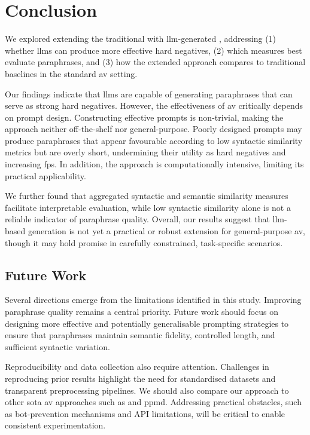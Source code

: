 \chapter{Conclusion}
\label{chap:conclusion}

We explored extending the traditional \impAppr{} with \ac{llm}-generated \imps{}, addressing (1) whether \acp{llm} can produce more effective hard negatives, (2) which measures best evaluate paraphrases, and (3) how the extended approach compares to traditional baselines in the standard \ac{av} setting.

Our findings indicate that \acp{llm} are capable of generating paraphrases that can serve as strong hard negatives. 
However, the effectiveness of \ac{av} critically depends on prompt design. 
Constructing effective prompts is non-trivial, making the approach neither off-the-shelf nor general-purpose. 
Poorly designed prompts may produce paraphrases that appear favourable according to low syntactic similarity metrics but are overly short, undermining their utility as hard negatives and increasing \acp{fp}. 
In addition, the approach is computationally intensive, limiting its practical applicability.  

We further found that aggregated syntactic and semantic similarity measures facilitate interpretable evaluation, while low syntactic similarity alone is not a reliable indicator of paraphrase quality. 
Overall, our results suggest that \ac{llm}-based \imp{} generation is not yet a practical or robust extension for general-purpose \ac{av}, though it may hold promise in carefully constrained, task-specific scenarios.  



\section{Future Work}

Several directions emerge from the limitations identified in this study. 
Improving paraphrase quality remains a central priority. 
Future work should focus on designing more effective and potentially generalisable prompting strategies to ensure that paraphrases maintain semantic fidelity, controlled length, and sufficient syntactic variation.  

Reproducibility and data collection also require attention. 
Challenges in reproducing prior results highlight the need for standardised datasets and transparent preprocessing pipelines. 
We should also compare our approach to other \acl{sota} \ac{av} approaches such as \unmasking{} and \ac{ppmd}.
Addressing practical obstacles, such as bot-prevention mechanisms and API limitations, will be critical to enable consistent experimentation.  

